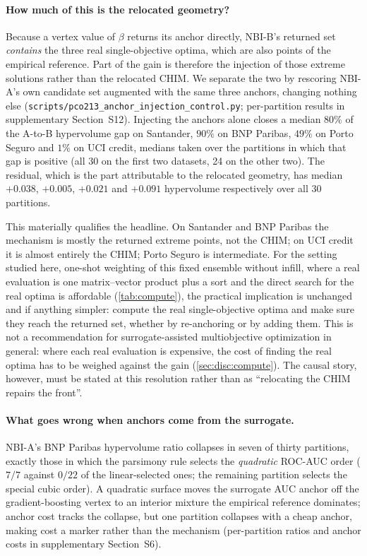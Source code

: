 \paragraph{How much of this is the relocated geometry?} Because a vertex value of $\beta$ returns its anchor directly,
NBI-B's returned set \emph{contains} the three real single-objective optima, which are also points of the empirical
reference. Part of the gain is therefore the injection of those extreme solutions rather than the relocated CHIM. We
separate the two by rescoring NBI-A's own candidate set augmented with the same three anchors, changing nothing else
(\texttt{scripts/\allowbreak pco213\_\allowbreak anchor\_\allowbreak injection\_\allowbreak control.py}; per-partition
results in supplementary Section~S12). Injecting the anchors alone closes a median $80\%$ of the
A-to-B hypervolume gap on Santander, $90\%$ on BNP Paribas, $49\%$ on Porto Seguro and $1\%$ on UCI credit, medians
taken over the partitions in which that gap is positive (all 30 on the first two datasets, 24 on the other two). The
residual, which is the part attributable to the relocated geometry, has median $+0.038$, $+0.005$, $+0.021$ and
$+0.091$ hypervolume respectively over all 30 partitions.

This materially qualifies the headline. On Santander and BNP Paribas the mechanism is mostly the returned extreme
points, not the CHIM; on UCI credit it is almost entirely the CHIM; Porto Seguro is intermediate. For the setting
studied here, one-shot weighting of this fixed ensemble without infill, where a real evaluation is one
matrix--vector product plus a sort and the direct search for the real optima is affordable (\cref{tab:compute}),
the practical implication is unchanged and if anything simpler: compute the real single-objective optima and make
sure they reach the returned set, whether by re-anchoring or by adding them. This is not a recommendation for
surrogate-assisted multiobjective optimization in general: where each real evaluation is expensive, the cost of
finding the real optima has to be weighed against the gain (\cref{sec:disc:compute}). The causal story, however,
must be stated at this resolution rather than as ``relocating the CHIM repairs the front''.

\paragraph{What goes wrong when anchors come from the surrogate.} NBI-A's BNP Paribas hypervolume ratio collapses in
seven of thirty partitions, exactly those in which the parsimony rule selects the \emph{quadratic} ROC-AUC order
($7/7$ against $0/22$ of the linear-selected ones; the remaining partition selects the special cubic order). A quadratic surface moves the surrogate AUC anchor off the
gradient-boosting vertex to an interior mixture the empirical reference dominates; anchor cost tracks the collapse,
but one partition collapses with a cheap anchor, making cost a marker rather than the mechanism (per-partition ratios
and anchor costs in supplementary Section~S6).

